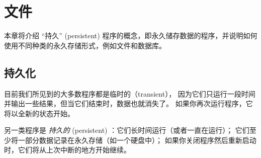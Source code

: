 

\chapter{文件}


本章将介绍 ``持久'' (persistent) 程序的概念，即永久储存数据的程序，并说明如何使用不同种类的永久存储形式，例如文件和数据库。

\section{持久化}

    


目前我们所见到的大多数程序都是临时的（transient），
因为它们只运行一段时间并输出一些结果，但当它们结束时，数据也就消失了。
如果你再次运行程序，它将以全新的状态开始。


另一类程序是 {\em 持久的} (persistent) ：它们长时间运行（或者一直在运行）；
它们至少将一部分数据记录在永久存储（如一个硬盘中）；
如果你关闭程序然后重新启动时，它们将从上次中断的地方开始继续。


